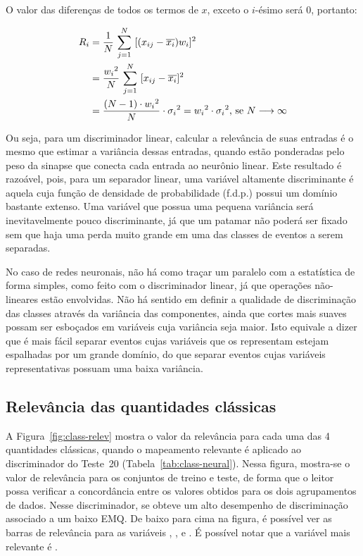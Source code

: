 O valor das diferenças de todos os termos de $x$, exceto o $i$-ésimo será 0,
portanto:

\begin{align}
R_i &= \frac{1}{N} \text{ } \overset{N}{\underset{j=1}{\sum}} \text{ } [(x_{ij}
- \overline{x_i})w_i]^2 \notag \\
 & = \frac{{w_i}^2}{N} \text{ } \overset{N}{\underset{j=1}{\sum}} \text{ } [x_{ij}
- \overline{x_i}]^2 \notag \\ 
 &= \frac{(N-1)\cdot{w_i}^2}{N}\cdot{\sigma_i}^2 =
{w_i}^2\cdot{\sigma_i}^2 \text{, se } N \longrightarrow \infty
\label{eq:rel-lin}
\end{align}

Ou seja, para um discriminador linear, calcular a relevância de suas entradas é
o mesmo que estimar a variância dessas entradas, quando estão ponderadas pelo
peso da sinapse que conecta cada entrada ao neurônio linear. Este resultado é
razoável, pois, para um separador linear, uma variável altamente discriminante é
aquela cuja função de densidade de probabilidade (f.d.p.) possui um domínio
bastante extenso. Uma variável que possua uma pequena variância será
inevitavelmente pouco discriminante, já que um patamar não poderá ser fixado
sem que haja uma perda muito grande em uma das classes de eventos a serem
separadas.

No caso de redes neuronais, não há como traçar um paralelo com a estatística de
forma simples, como feito com o discriminador linear, já que operações
não-lineares estão envolvidas. Não há sentido em definir a qualidade de
discriminação das classes através da variância das componentes, ainda que
cortes mais suaves possam ser esboçados em variáveis cuja variância seja
maior. Isto equivale a dizer que é mais fácil separar eventos cujas variáveis
que os representam estejam espalhadas por um grande domínio, do que separar
eventos cujas variáveis representativas possuam uma baixa variância.


\subsection{Relevância das quantidades clássicas}

A Figura~\ref{fig:class-relev} mostra o valor da relevância para cada uma das
4 quantidades clássicas, quando o mapeamento relevante é aplicado ao
discriminador do Teste~20 (Tabela~\ref{tab:class-neural}). Nessa figura,
mostra-se o valor de relevância para os conjuntos de treino e teste, de forma
que o leitor possa verificar a concordância entre os valores obtidos para os
dois agrupamentos de dados. Nesse discriminador, se obteve um alto desempenho
de discriminação associado a um baixo EMQ. De baixo para cima na figura, é
possível ver as barras de relevância para as variáveis \etem, \ethad, \rshape
e
\rstrip. É possível notar que a variável mais relevante é \ethad.

